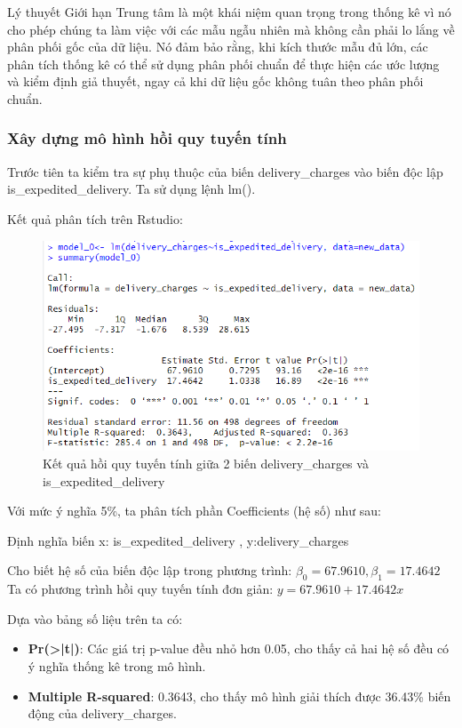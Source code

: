 Lý thuyết Giới hạn Trung tâm là một khái niệm quan trọng trong thống kê vì nó cho phép chúng ta làm việc với các mẫu ngẫu nhiên mà không cần phải lo lắng về phân phối gốc của dữ liệu. Nó đảm bảo rằng, khi kích thước mẫu đủ lớn, các phân tích thống kê có thể sử dụng phân phối chuẩn để thực hiện các ước lượng và kiểm định giả thuyết, ngay cả khi dữ liệu gốc không tuân theo phân phối chuẩn.
\subsubsection{Xây dựng mô hình hồi quy tuyến tính}
Trước tiên ta kiểm tra sự phụ thuộc của biến delivery\_charges vào biến độc lập is\_expedited\_delivery. Ta sử dụng lệnh lm().

Kết quả phân tích trên Rstudio:
\begin{figure}[ht]
  \centering
  \includegraphics[width=0.7\linewidth]{graphics/5.5.1.png}
  \caption{Kết quả hồi quy tuyến tính giữa 2 biến delivery\_charges và is\_expedited\_delivery  }
\end{figure}


Với mức ý nghĩa 5\%, ta phân tích phần Coefficients (hệ số) như sau:

Định nghĩa biến x: is\_expedited\_delivery
, y:delivery\_charges

Cho biết hệ số của biến độc lập trong phương trình: $\beta_0= 67.9610, \beta_1= 17.4642 $
 Ta có phương trình hồi quy tuyến tính đơn giản: $y= 67.9610 + 17.4642x$

 Dựa vào bảng số liệu trên ta có:\\
 \begin{itemize}
 \item\textbf{Pr(>|t|)}: Các giá trị p-value đều nhỏ hơn 0.05, cho thấy cả hai hệ số đều có ý nghĩa thống kê trong mô hình.
\item\textbf{Multiple R-squared}: 0.3643, cho thấy mô hình giải thích được 36.43\% biến động của delivery\_charges.
 \end{itemize}

